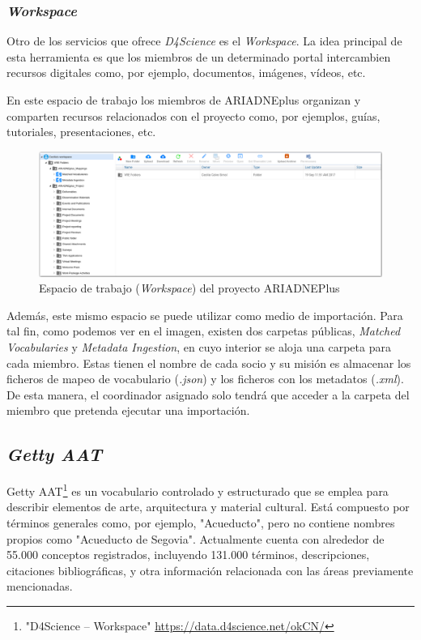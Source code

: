 \documentclass[
]{article}
\begin{document}
\hypertarget{workspace}{%
\subsubsection{\texorpdfstring{\emph{Workspace}}{Workspace}}\label{workspace}}

Otro de los servicios que ofrece \emph{D4Science} es el
\emph{Workspace}. La idea principal de esta herramienta es que los
miembros de un determinado portal intercambien recursos digitales como,
por ejemplo, documentos, imágenes, vídeos, etc.

En este espacio de trabajo los miembros de ARIADNEplus organizan y
comparten recursos relacionados con el proyecto como, por ejemplos,
guías, tutoriales, presentaciones, etc.

\begin{figure}
\hypertarget{workspace}{%
\centering
\includegraphics{../_static/images/workspace.png}
\caption{Espacio de trabajo (\emph{Workspace}) del proyecto
ARIADNEPlus}\label{workspace}
}
\end{figure}

Además, este mismo espacio se puede utilizar como medio de importación.
Para tal fin, como podemos ver en el imagen, existen dos carpetas
públicas, \emph{Matched Vocabularies} y \emph{Metadata Ingestion}, en
cuyo interior se aloja una carpeta para cada miembro. Estas tienen el
nombre de cada socio y su misión es almacenar los ficheros de mapeo de
vocabulario (\emph{.json}) y los ficheros con los metadatos
(\emph{.xml}). De esta manera, el coordinador asignado solo tendrá que
acceder a la carpeta del miembro que pretenda ejecutar una importación.

\hypertarget{getty-aat}{%
\subsection{\texorpdfstring{\emph{Getty
AAT}}{Getty AAT}}\label{getty-aat}}

Getty AAT\footnote{"D4Science -- Workspace"
  \url{https://data.d4science.net/okCN/}} es un vocabulario controlado y
estructurado que se emplea para describir elementos de arte,
arquitectura y material cultural. Está compuesto por términos generales
como, por ejemplo, "Acueducto", pero no contiene nombres propios como
"Acueducto de Segovia". Actualmente cuenta con alrededor de 55.000
conceptos registrados, incluyendo 131.000 términos, descripciones,
citaciones bibliográficas, y otra información relacionada con las áreas
previamente mencionadas.
\end{document}
